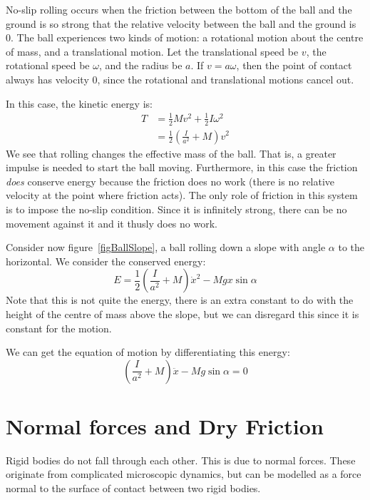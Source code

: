 \documentclass[../Main.tex]{subfiles}
\begin{document}
\begin{example}
    No-slip rolling occurs when the friction between the bottom of the ball and the ground is so strong that the relative velocity between the ball and the ground is 0. The ball experiences two kinds of motion: a rotational motion about the centre of mass, and a translational motion. Let the translational speed be $v$, the rotational speed be $\omega$, and the radius be $a$. If $v = a\omega$, then the point of contact always has velocity $0$, since the rotational and translational motions cancel out.\par
    In this case, the kinetic energy is:
    \begin{align*}
        T &= \frac{1}{2} M v^2 + \frac{1}{2} I\omega^2 \\
        &= \frac{1}{2} \left(\frac{I}{a^2} + M\right)v^2
    \end{align*}
    We see that rolling changes the effective mass of the ball. That is, a greater impulse is needed to start the ball moving. Furthermore, in this case the friction \textit{does} conserve energy because the friction does no work (there is no relative velocity at the point where friction acts). The only role of friction in this system is to impose the no-slip condition. Since it is infinitely strong, there can be no movement against it and it thusly does no work.\par
    Consider now figure~\ref{figBallSlope}, a ball rolling down a slope with angle $\alpha$ to the horizontal. We consider the conserved energy:
    \begin{equation*}
        E = \frac{1}{2}\left(\frac{I}{a^2} + M\right)\dot{x}^2 - Mgx \sin{\alpha}
    \end{equation*}
    Note that this is not quite the energy, there is an extra constant to do with the height of the centre of mass above the slope, but we can disregard this since it is constant for the motion.\par
    We can get the equation of motion by differentiating this energy:
    \begin{equation*}
        \left(\frac{I}{a^2} + M\right)\ddot{x} - Mg\sin{\alpha} = 0
    \end{equation*}
\end{example}
\section{Normal forces and Dry Friction}
Rigid bodies do not fall through each other. This is due to normal forces. These originate from complicated microscopic dynamics, but can be modelled as a force normal to the surface of contact between two rigid bodies.
\end{document}
